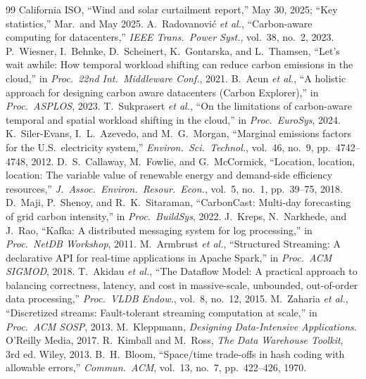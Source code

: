 \documentclass[conference]{IEEEtran}
\begin{document}
\begin{thebibliography}{99}
 California ISO, ``Wind and solar curtailment report,'' May 30, 2025; ``Key statistics,'' Mar.\ and May 2025.
 A.~Radovanovi\'c \emph{et al.}, ``Carbon-aware computing for datacenters,'' \emph{IEEE Trans.\ Power Syst.}, vol.~38, no.~2, 2023.
 P.~Wiesner, I.~Behnke, D.~Scheinert, K.~Gontarska, and L.~Thamsen, ``Let's wait awhile: How temporal workload shifting can reduce carbon emissions in the cloud,'' in \emph{Proc.\ 22nd Int.\ Middleware Conf.}, 2021.
 B.~Acun \emph{et al.}, ``A holistic approach for designing carbon aware datacenters (Carbon Explorer),'' in \emph{Proc.\ ASPLOS}, 2023.
 T.~Sukprasert \emph{et al.}, ``On the limitations of carbon-aware temporal and spatial workload shifting in the cloud,'' in \emph{Proc.\ EuroSys}, 2024.
 K.~Siler-Evans, I.~L.~Azevedo, and M.~G.~Morgan, ``Marginal emissions factors for the U.S.\ electricity system,'' \emph{Environ.\ Sci.\ Technol.}, vol.~46, no.~9, pp.~4742--4748, 2012.
 D.~S.~Callaway, M.~Fowlie, and G.~McCormick, ``Location, location, location: The variable value of renewable energy and demand-side efficiency resources,'' \emph{J.\ Assoc.\ Environ.\ Resour.\ Econ.}, vol.~5, no.~1, pp.~39--75, 2018.
 D.~Maji, P.~Shenoy, and R.~K.~Sitaraman, ``CarbonCast: Multi-day forecasting of grid carbon intensity,'' in \emph{Proc.\ BuildSys}, 2022.
 J.~Kreps, N.~Narkhede, and J.~Rao, ``Kafka: A distributed messaging system for log processing,'' in \emph{Proc.\ NetDB Workshop}, 2011.
 M.~Armbrust \emph{et al.}, ``Structured Streaming: A declarative API for real-time applications in Apache Spark,'' in \emph{Proc.\ ACM SIGMOD}, 2018.
 T.~Akidau \emph{et al.}, ``The Dataflow Model: A practical approach to balancing correctness, latency, and cost in massive-scale, unbounded, out-of-order data processing,'' \emph{Proc.\ VLDB Endow.}, vol.~8, no.~12, 2015.
 M.~Zaharia \emph{et al.}, ``Discretized streams: Fault-tolerant streaming computation at scale,'' in \emph{Proc.\ ACM SOSP}, 2013.
 M.~Kleppmann, \emph{Designing Data-Intensive Applications}. O'Reilly Media, 2017.
 R.~Kimball and M.~Ross, \emph{The Data Warehouse Toolkit}, 3rd ed. Wiley, 2013.
 B.~H.~Bloom, ``Space/time trade-offs in hash coding with allowable errors,'' \emph{Commun.\ ACM}, vol.~13, no.~7, pp.~422--426, 1970.

\end{thebibliography}
\end{document}
